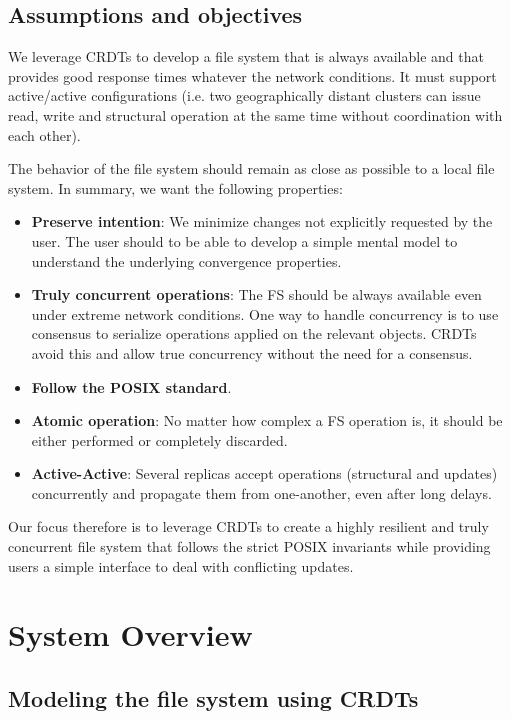 \documentclass[sigconf, anonymous, 10pt]{acmart}
\begin{document}
\subsection{Assumptions and objectives}

We leverage CRDTs to develop a file system that is always available
and that provides good response times whatever the network conditions.
It must support active/active configurations
(i.e. two geographically distant clusters can issue read, write and structural
operation at the same time without coordination with each other).

The behavior of the file system should remain as close as possible to a local file system.
In summary, we want the following properties:

\begin{itemize}
	\item \textbf{Preserve intention}: We minimize changes not explicitly requested by the user.
	The user should to be able to develop a simple mental model to understand
	the underlying convergence properties.
	\item \textbf{Truly concurrent operations}: The FS should be always available even under extreme network conditions.
	One way to handle concurrency
	is to use consensus to serialize operations applied on the relevant objects.
	CRDTs avoid this and allow true concurrency without the need for a consensus.
	\item \textbf{Follow the POSIX standard}.
	\item \textbf{Atomic operation}: No matter how complex a FS operation is, it should be either performed or completely discarded.
	\item \textbf{Active-Active}: Several replicas accept operations
	(structural and updates) concurrently and propagate them from one-another,
	even after long delays.
\end{itemize}

Our focus therefore is to leverage CRDTs to create a highly resilient and
truly concurrent file system that follows the strict POSIX invariants
while providing users a simple interface to deal with conflicting updates.

\section{System Overview}

\subsection{Modeling the file system using CRDTs}
\end{document}
